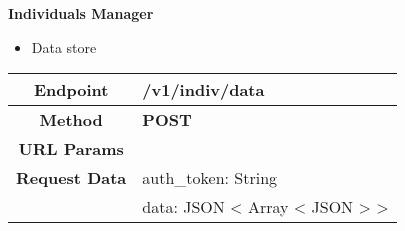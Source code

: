     \textbf{Individuals Manager}
    \begin{itemize}
        \item Data store
    \end{itemize}
    \begin{adjustwidth}{1cm}{}
        \begin{longtable}{|c|l|}
            \hline
            \textbf{Endpoint} & /v1/indiv/data \\
            \hline
            \textbf{Method} & \textbf{POST} \\
            \hline
            \textbf{URL Params} &  \\
            \hline
            \textbf{Request Data} & auth\_token: String \\
            &                 data: JSON < Array < JSON > > \\
            

\end{longtable}
\end{adjustwidth}
